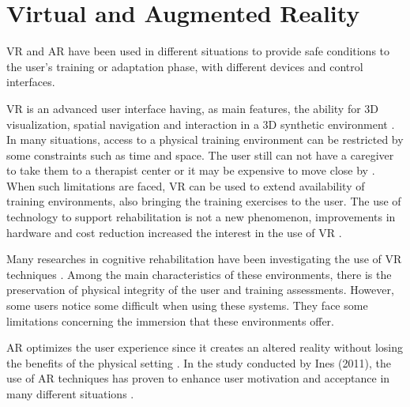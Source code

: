 \section{Virtual and Augmented Reality}
\label{sec:vareality}

VR and AR have been used in different situations to provide safe conditions to the user's training or adaptation phase, with different devices and control interfaces. 

VR is an advanced user interface having, as main features, the ability for 3D visualization, spatial navigation and interaction in a 3D synthetic environment \cite{tori2006}. In many situations, access to a physical training environment can be restricted by some constraints such as time and space. The user still can not have a caregiver to take them to a therapist center or it may be expensive to move close by \cite{mitsumura2014}. When such limitations are faced, VR can be used to extend availability of training environments, also bringing the training exercises to the user. The use of technology to support rehabilitation is not a new phenomenon, improvements in hardware and cost reduction increased the interest in the use of VR \cite{wiederhold2019,powell2014}. 

Many researches in cognitive rehabilitation have been investigating the use of  VR techniques \cite{vailland2019,john2018, kamaraj2016, mahajan2013}. Among the main characteristics of these environments, there is the preservation of physical integrity of the user and training assessments. However, some users notice some difficult when using these systems. They face some limitations concerning the immersion that these environments offer.

AR optimizes the user experience since it creates an altered reality without losing the benefits of the physical setting \cite{wiederhold2019}. In the study conducted by Ines (2011), the use of AR techniques has proven to enhance user motivation and acceptance in many different situations \cite{ines2011}. 

